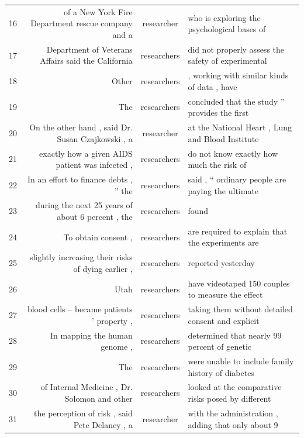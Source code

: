 {\begin{table}
\begin{tabular}{|lrcl|}
16 & of a New York Fire Department rescue company and a & researcher  & who is exploring the psychological bases of        \\
17 & Department of Veterans Affairs said the California & researchers & did not properly assess the safety of experimental \\
18 & Other                                              & researchers & , working with similar kinds of data , have        \\
19 & The                                                & researchers & concluded that the study '' provides the first     \\
20 & On the other hand , said Dr. Susan Czajkowski , a  & researcher  & at the National Heart , Lung and Blood Institute   \\
21 & exactly how a given AIDS patient was infected ,    & researchers & do not know exactly how much the risk of           \\
22 & In an effort to finance debts , '' the             & researchers & said , `` ordinary people are paying the ultimate  \\
23 & during the next 25 years of about 6 percent , the  & researchers & found                                              \\
24 & To obtain consent ,                                & researchers & are required to explain that the experiments are   \\
25 & slightly increasing their risks of dying earlier , & researchers & reported yesterday                                 \\
26 & Utah                                               & researchers & have videotaped 150 couples to measure the effect  \\
27 & blood cells -- became patients ' property ,        & researchers & taking them without detailed consent and explicit  \\
28 & In mapping the human genome ,                      & researchers & determined that nearly 99 percent of genetic       \\
29 & The                                                & researchers & were unable to include family history of diabetes  \\
30 & of Internal Medicine , Dr. Solomon and other       & researchers & looked at the comparative risks posed by different \\
31 & the perception of risk , said Pete Delaney , a     & researcher  & with the administration , adding that only about 9 \\

\end{tabular}
\end{table}}
